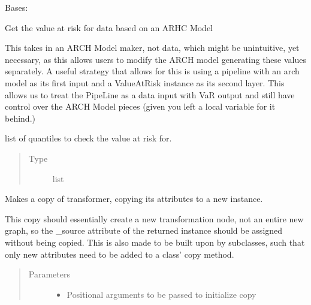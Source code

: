 \documentclass[letterpaper,10pt,english]{sphinxmanual}
\begin{document}
\begin{fulllineitems}
\label{\detokenize{dalio.pipe:dalio.pipe.builders.ValueAtRisk}}
Bases: {\hyperref[\detokenize{dalio.pipe:dalio.pipe.pipe.Pipe}]{}}

Get the value at risk for data based on an ARHC Model

This takes in an ARCH Model maker, not data, which might be unintuitive,
yet necessary, as this allows users to modify the ARCH model generating
these values separately. A useful strategy that allows for this
is using a pipeline with an arch model as its first input and a
ValueAtRisk instance as its second layer. This allows us to treat the
PipeLine as a data input with VaR output and still have control over the
ARCH Model pieces (given you left a local variable for it behind.)

\begin{fulllineitems}
\label{\detokenize{dalio.pipe:dalio.pipe.builders.ValueAtRisk._quantiles}}
list of quantiles to check the value at risk for.
\begin{quote}\begin{description}
\item[{Type}] \leavevmode
list

\end{description}\end{quote}

\end{fulllineitems}


\begin{fulllineitems}
\label{\detokenize{dalio.pipe:dalio.pipe.builders.ValueAtRisk.copy}}
Makes a copy of transformer, copying its attributes to a new
instance.

This copy should essentially create a new transformation node, not an
entire new graph, so the \_source attribute of the returned instance
should be assigned without being copied. This is also made to be built
upon by subclasses, such that only new attributes need to be added to
a class’ copy method.
\begin{quote}\begin{description}
\item[{Parameters}] \leavevmode\begin{itemize}
\item {} 
 \textendash{} Positional arguments to be passed to initialize copy


\end{itemize}
\end{description}
\end{quote}
\end{fulllineitems}
\end{fulllineitems}
\end{document}
